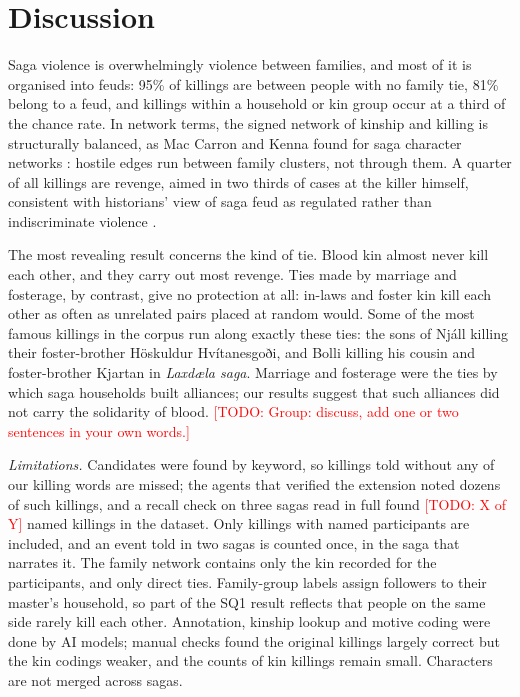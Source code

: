 \documentclass[9pt,twocolumn,twoside]{pnas-new}
\newcommand{\TODO}[1]{\textcolor{red}{[TODO: #1]}}
\begin{document}
\section*{Discussion}
Saga violence is overwhelmingly violence between families, and most of it is organised into feuds: 95\% of killings are between people with no family tie, 81\% belong to a feud, and killings within a household or kin group occur at a third of the chance rate. In network terms, the signed network of kinship and killing is structurally balanced, as Mac Carron and Kenna found for saga character networks \cite{maccarron2013}: hostile edges run between family clusters, not through them. A quarter of all killings are revenge, aimed in two thirds of cases at the killer himself, consistent with historians' view of saga feud as regulated rather than indiscriminate violence \cite{byock1982,miller1990}.

The most revealing result concerns the kind of tie. Blood kin almost never kill each other, and they carry out most revenge. Ties made by marriage and fosterage, by contrast, give no protection at all: in-laws and foster kin kill each other as often as unrelated pairs placed at random would. Some of the most famous killings in the corpus run along exactly these ties: the sons of Njáll killing their foster-brother Höskuldur Hvítanesgoði, and Bolli killing his cousin and foster-brother Kjartan in \textit{Laxdæla saga}. Marriage and fosterage were the ties by which saga households built alliances; our results suggest that such alliances did not carry the solidarity of blood. \TODO{Group: discuss, add one or two sentences in your own words.}

\textit{Limitations.} Candidates were found by keyword, so killings told without any of our killing words are missed; the agents that verified the extension noted dozens of such killings, and a recall check on three sagas read in full found \TODO{X of Y} named killings in the dataset. Only killings with named participants are included, and an event told in two sagas is counted once, in the saga that narrates it. The family network contains only the kin recorded for the participants, and only direct ties. Family-group labels assign followers to their master's household, so part of the SQ1 result reflects that people on the same side rarely kill each other. Annotation, kinship lookup and motive coding were done by AI models; manual checks found the original killings largely correct but the kin codings weaker, and the counts of kin killings remain small. Characters are not merged across sagas.
\end{document}
